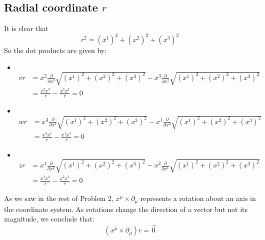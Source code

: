 \documentclass{article}
\begin{document}
 		\subsection{Radial coordinate $r$}
 			It is clear that
 			$$ r^2 = (x^1)^2 + (x^2)^2 + (x^3)^2$$
 			So the dot products are given by:
 			\begin{itemize}
 				\item $ $\vspace{-1cm}
 					\begin{align*}
 						vr &= x^2 \frac{\partial}{\partial x^3} \sqrt{(x^1)^2 + (x^2)^2 + (x^3)^2} - x^3 \frac{\partial}{\partial x^2} \sqrt{(x^1)^2 + (x^2)^2 + (x^3)^2} \\
 						&= \frac{x^2 x^3}{r} - \frac{x^3 x^2}{r} = 0
 					\end{align*}
 				\item $ $\vspace{-1cm}
 					\begin{align*}
 						wr &= x^3 \frac{\partial}{\partial x^1} \sqrt{(x^1)^2 + (x^2)^2 + (x^3)^2} - x^1 \frac{\partial}{\partial x^3} \sqrt{(x^1)^2 + (x^2)^2 + (x^3)^2} \\
 						&= \frac{x^3 x^1}{r} - \frac{x^1 x^3}{r} = 0
 					\end{align*}
 				\item $ $\vspace{-1cm}
	 				\begin{align*}
	 					zr &= x^1 \frac{\partial}{\partial x^2} \sqrt{(x^1)^2 + (x^2)^2 + (x^3)^2} - x^2 \frac{\partial}{\partial x^1} \sqrt{(x^1)^2 + (x^2)^2 + (x^3)^2} \\
	 					&= \frac{x^1 x^2}{r} - \frac{x^2 x^1}{r} = 0
	 				\end{align*}
 			\end{itemize}
 			As we saw in the rest of Problem 2, $x^\mu \times \partial_\mu$ represents a rotation about an axis in the coordinate system. As rotations change the direction of a vector but not its magnitude, we conclude that:
 			$$ (x^\mu \times \partial_\mu)r = \vec{0}$$
\end{document}
